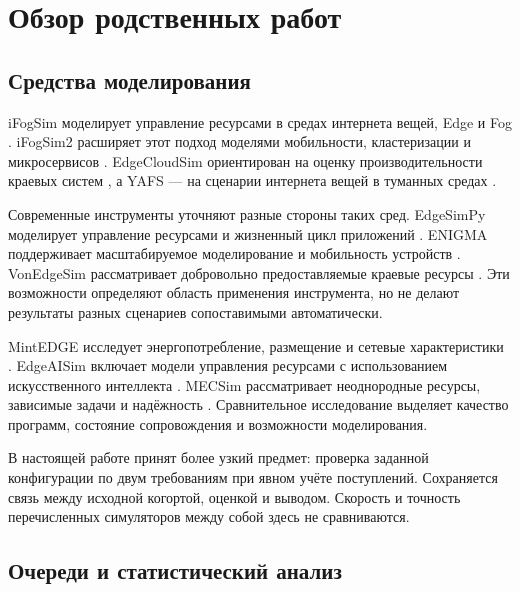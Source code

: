 \hypertarget{ux43eux431ux437ux43eux440-ux440ux43eux434ux441ux442ux432ux435ux43dux43dux44bux445-ux440ux430ux431ux43eux442}{%
\section{Обзор родственных работ}}

\hypertarget{ux441ux440ux435ux434ux441ux442ux432ux430-ux43cux43eux434ux435ux43bux438ux440ux43eux432ux430ux43dux438ux44f}{%
\subsection{Средства моделирования}}

iFogSim моделирует управление ресурсами в средах интернета вещей, Edge и Fog \cite{ifogsim}. iFogSim2 расширяет этот подход моделями мобильности, кластеризации и микросервисов \cite{ifogsim2}. EdgeCloudSim ориентирован на оценку производительности краевых систем \cite{edgecloudsim}, а YAFS --- на сценарии интернета вещей в туманных средах \cite{yafs}.

Современные инструменты уточняют разные стороны таких сред. EdgeSimPy моделирует управление ресурсами и жизненный цикл приложений \cite{edgesimpy}. ENIGMA поддерживает масштабируемое моделирование и мобильность устройств \cite{enigma}. VonEdgeSim рассматривает добровольно предоставляемые краевые ресурсы \cite{vonedge}. Эти возможности определяют область применения инструмента, но не делают результаты разных сценариев сопоставимыми автоматически.

MintEDGE исследует энергопотребление, размещение и сетевые характеристики \cite{mintedge}. EdgeAISim включает модели управления ресурсами с использованием искусственного интеллекта \cite{edgeaisim}. MECSim рассматривает неоднородные ресурсы, зависимые задачи и надёжность \cite{mecsim}. Сравнительное исследование \cite{quality} выделяет качество программ, состояние сопровождения и возможности моделирования.

В настоящей работе принят более узкий предмет: проверка заданной конфигурации по двум требованиям при явном учёте поступлений. Сохраняется связь между исходной когортой, оценкой и выводом. Скорость и точность перечисленных симуляторов между собой здесь не сравниваются.

\hypertarget{ux43eux447ux435ux440ux435ux434ux438-ux438-ux441ux442ux430ux442ux438ux441ux442ux438ux447ux435ux441ux43aux438ux439-ux430ux43dux430ux43bux438ux437}{%
\subsection{Очереди и статистический анализ}}

